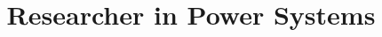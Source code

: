 \documentclass[11pt,a4paper,sans]{moderncv}        %
\title{Researcher in Power Systems}
\begin{document}
\makecvtitle %



\newpage



\end{document}
